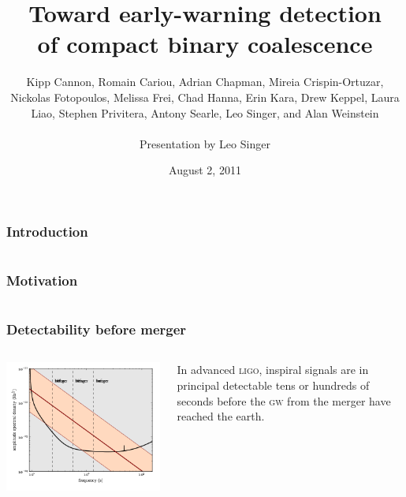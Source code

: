 \documentclass{beamer}
\title[LIGO-Gxxxxxxx-vx]{Toward early-warning detection \\ of compact binary coalescence}
\institute[LIGO Caltech]{LIGO Laboratory, California Institute of Technology}
\author[L Singer]{\footnotesize{
	Kipp Cannon,
	Romain Cariou,
	Adrian Chapman,
	Mireia Crispin-Ortuzar,
	Nickolas Fotopoulos,
	Melissa Frei,
	Chad Hanna,
	Erin Kara,
	Drew Keppel,
	Laura Liao,
	Stephen Privitera,
	Antony Searle,
	Leo Singer, and
	Alan Weinstein} \\~\\ Presentation by Leo Singer}
\date{August 2, 2011}
\begin{document}
\frame{\titlepage}


\begin{frame}
\frametitle{Introduction}
\end{frame}


\section[Outline]{}
\frame{\tableofcontents}


\section[Motivation]{}


\begin{frame}
\frametitle{Motivation}
\end{frame}


\section[Prospects for early-warning detection]{}


\begin{frame}
	\frametitle{Detectability before merger}
	\begin{columns}
		\begin{column}{0.7\textwidth}
			\includegraphics[width=\textwidth]{figures/snr_psd}
		\end{column}
		\begin{column}{0.3\textwidth}
			In advanced \textsc{ligo}, inspiral signals are in principal detectable {\color{ink3}tens or hundreds of seconds} before the \textsc{gw} from the merger have reached the earth.
		\end{column}
	\end{columns}
\end{frame}
\end{document}
